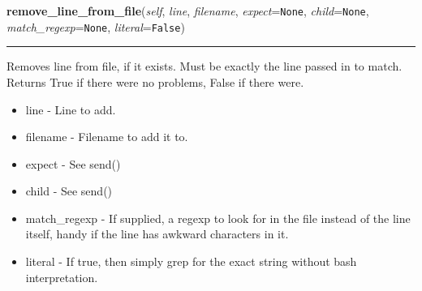     \label{shutit_global:ShutIt:remove_line_from_file}

    \vspace{0.5ex}

\hspace{.8\funcindent}\begin{boxedminipage}{\funcwidth}

    \raggedright \textbf{remove\_line\_from\_file}(\textit{self}, \textit{line}, \textit{filename}, \textit{expect}={\tt None}, \textit{child}={\tt None}, \textit{match\_regexp}={\tt None}, \textit{literal}={\tt False})

    \vspace{-1.5ex}

    \rule{\textwidth}{0.5\fboxrule}
\setlength{\parskip}{2ex}
    Removes line from file, if it exists. Must be exactly the line passed 
    in to match. Returns True if there were no problems, False if there 
    were.

    \begin{itemize}
    \setlength{\parskip}{0.6ex}
      \item line         - Line to add.

      \item filename     - Filename to add it to.

      \item expect       - See send()

      \item child        - See send()

      \item match\_regexp - If supplied, a regexp to look for in the file 
        instead of the line itself, handy if the line has awkward 
        characters in it.

      \item literal      - If true, then simply grep for the exact string 
        without bash interpretation.

    \end{itemize}

\setlength{\parskip}{1ex}
    \end{boxedminipage}

    \label{shutit_global:ShutIt:add_line_to_file}

